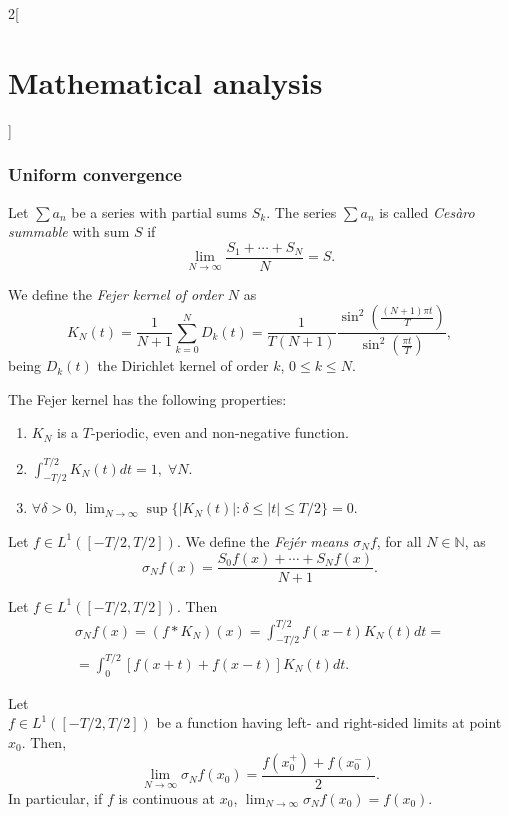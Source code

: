 \documentclass[class=article,crop=false]{standalone}
\begin{document}
\begin{multicols}{2}[\section{Mathematical analysis}]
\subsubsection*{Uniform convergence}
\begin{definition}
Let $\sum a_n$ be a series with partial sums $S_k$. The series $\sum a_n$ is called \textit{Cesàro summable} with sum $S$ if $$\lim_{N\to\infty}\frac{S_1+\cdots+S_N}{N}=S.$$
\end{definition}
\begin{definition}
We define the \textit{Fejer kernel of order $N$} as $$K_N(t)=\frac{1}{N+1}\sum_{k=0}^ND_k(t)=\frac{1}{T(N+1)}\frac{\sin^2\left(\frac{(N+1)\pi t}{T}\right)}{\sin^2\left(\frac{\pi t}{T}\right)},$$ being $D_k(t)$ the Dirichlet kernel of order $k$, $0\leq k\leq N$.
\end{definition}
\begin{prop}
The Fejer kernel has the following properties:
\begin{enumerate}
    \item $K_N$ is a $T$-periodic, even and non-negative function.
    \item $\displaystyle\int_{-T/2}^{T/2}K_N(t)dt=1,\;\forall N$.
    \item $\forall\delta>0$, $\displaystyle\lim_{N\to\infty}\sup\{|K_N(t)|:\delta\leq|t|\leq T/2\}=0$.
\end{enumerate}
\end{prop}
\begin{definition}
Let $f\in L^1([-T/2,T/2])$. We define the \textit{Fejér means $\sigma_Nf$}, for all $N\in\mathbb{N}$, as $$\sigma_Nf(x)=\frac{S_0f(x)+\cdots+S_Nf(x)}{N+1}.$$
\end{definition}
\begin{prop}
Let $f\in L^1([-T/2,T/2])$. Then \begin{multline*}\sigma_Nf(x)=(f*K_N)(x)=\int_{-T/2}^{T/2}f(x-t)K_N(t)dt=\\=\int_0^{T/2}[f(x+t)+f(x-t)]K_N(t)dt.\end{multline*}
\end{prop}
\begin{theorem}
Let \\$f\in L^1([-T/2,T/2])$ be a function having left- and right-sided limits at point $x_0$. Then, $$\lim_{N\to\infty}\sigma_Nf(x_0)=\frac{f(x_0^+)+f(x_0^-)}{2}.$$ In particular, if $f$ is continuous at $x_0$, $\displaystyle\lim_{N\to\infty}\sigma_Nf(x_0)=f(x_0).$
\end{theorem}
\begin{theorem}

\end{theorem}
\end{multicols}
\end{document}
